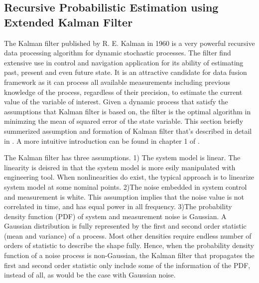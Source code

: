 \subsection{Recursive Probabilistic Estimation using Extended Kalman Filter}
\label{sec:SLAM_using_EKF}

The Kalman filter \cite{kalman_new_1960}published by R. E. Kalman in
1960 is a very powerful recursive data processing algorithm for
dynamic stochastic processes. The filter find extensive use in control
and navigation application for its ability of estimating past, present
and even future state. It is an attractive candidate for data fusion
framework as it can process all available measurements including
previous knowledge of the process, regardless of their precision, to
estimate the current value of the variable of interest. Given a
dynamic process that satisfy the assumptions that Kalman filter is
based on, the filter is the optimal algorithm in minimzing the mean of
squared error of the state variable. This section briefly summerized
assumption and formation of Kalman filter that's described in detail
in \cite{sorenson_least-squares_1970}
\cite{analytic_sciences_corporation_applied_1974}
\cite{grewal_kalman_1993} \cite{lewis_optimal_1986}
\cite{brown_introduction_1993}. A more intuitive introduction can be
found in chapter 1 of \cite{maybeck_stochastic_1979}.

The Kalman filter has three assumptions. 1) The system model is
linear. The linearity is deisred in that the system model is more
esily manipulated with engineering tool. When nonlinearities do exist,
the typical approach is to linearize system model at some nominal
points. 2)The noise embedded in system control and measurement is
white. This assumption implies that the noise value is not correlated
in time, and has equal power in all frequency. 3)The probability
density function (PDF) of system and measurement noise is Gaussian. A
Gaussian distribution is fully represented by the first and second
order statistic (mean and variance) of a process. Most other densities
require endless number of orders of statistic to describe the shape
fully. Hence, when the probability density function of a noise process
is non-Gaussian, the Kalman filter that propagates the first and
second order statistic only include some of the information of the
PDF, instead of all, as would be the case with Gaussian noise.

